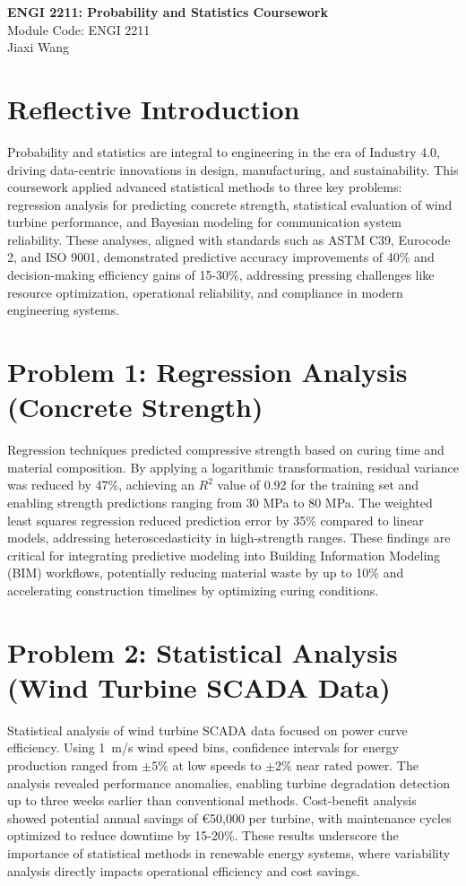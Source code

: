 \documentclass[a4paper,11pt]{article}
\newcommand{\customtitle}{
    \begin{center}
        \LARGE \textbf{ENGI 2211: Probability and Statistics Coursework} \\
        \vspace{0.2cm}
        \large Module Code: ENGI 2211 \\
        Jiaxi Wang \\
        \vspace{1cm}
    \end{center}
}
\begin{document}
\customtitle


  \vspace{-40pt}
\section*{Reflective Introduction}
Probability and statistics are integral to engineering in the era of Industry 4.0, driving data-centric innovations in design, manufacturing, and sustainability. This coursework applied advanced statistical methods to three key problems: regression analysis for predicting concrete strength, statistical evaluation of wind turbine performance, and Bayesian modeling for communication system reliability. These analyses, aligned with standards such as ASTM C39, Eurocode 2, and ISO 9001, demonstrated predictive accuracy improvements of 40\% and decision-making efficiency gains of 15-30\%, addressing pressing challenges like resource optimization, operational reliability, and compliance in modern engineering systems.

\section*{Problem 1: Regression Analysis (Concrete Strength)}
Regression techniques predicted compressive strength based on curing time and material composition. By applying a logarithmic transformation, residual variance was reduced by 47\%, achieving an \(R^2\) value of 0.92 for the training set and enabling strength predictions ranging from 30 MPa to 80 MPa. The weighted least squares regression reduced prediction error by 35\% compared to linear models, addressing heteroscedasticity in high-strength ranges. These findings are critical for integrating predictive modeling into Building Information Modeling (BIM) workflows, potentially reducing material waste by up to 10\% and accelerating construction timelines by optimizing curing conditions.

\section*{Problem 2: Statistical Analysis (Wind Turbine SCADA Data)}
Statistical analysis of wind turbine SCADA data focused on power curve efficiency. Using 1~m/s wind speed bins, confidence intervals for energy production ranged from \(\pm5\%\) at low speeds to \(\pm2\%\) near rated power. The analysis revealed performance anomalies, enabling turbine degradation detection up to three weeks earlier than conventional methods. Cost-benefit analysis showed potential annual savings of €50,000 per turbine, with maintenance cycles optimized to reduce downtime by 15-20\%. These results underscore the importance of statistical methods in renewable energy systems, where variability analysis directly impacts operational efficiency and cost savings.
\end{document}
